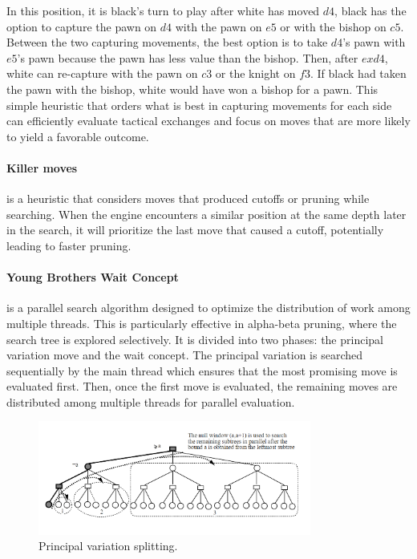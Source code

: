 \noindent In this position, it is black's turn to play after white has moved $d4$, black has the option to capture the pawn on $d4$ with the pawn on $e5$ or with the bishop on $c5$. Between the two capturing movements, the best option is to take $d4$'s pawn with $e5$'s pawn because the pawn has less value than the bishop. Then, after $exd4$, white can re-capture with the pawn on $c3$ or the knight on $f3$. If black had taken the pawn with the bishop, white would have won a bishop for a pawn. This simple heuristic that orders what is best in capturing movements for each side can efficiently evaluate tactical exchanges and focus on moves that are more likely to yield a favorable outcome.

\paragraph{Killer moves} is a heuristic that considers moves that produced cutoffs or pruning while searching. When the engine encounters a similar position at the same depth later in the search, it will prioritize the last move that caused a cutoff, potentially leading to faster pruning.

\paragraph{Young Brothers Wait Concept} is a parallel search algorithm designed to optimize the distribution of work among multiple threads. This is particularly effective in alpha-beta pruning, where the search tree is explored selectively. It is divided into two phases: the principal variation move and the wait concept. The principal variation is searched sequentially by the main thread which ensures that the most promising move is evaluated first. Then, once the first move is evaluated, the remaining moves are distributed among multiple threads for parallel evaluation.

\begin{figure}[H]
    \centering
    \includegraphics[width=0.8\textwidth]{Imagenes/Bitmap/pvsplitting.png}
    \caption{Principal variation splitting.~\cite{PVSplitting}}
    \label{fig:pv-splitting}
\end{figure}


